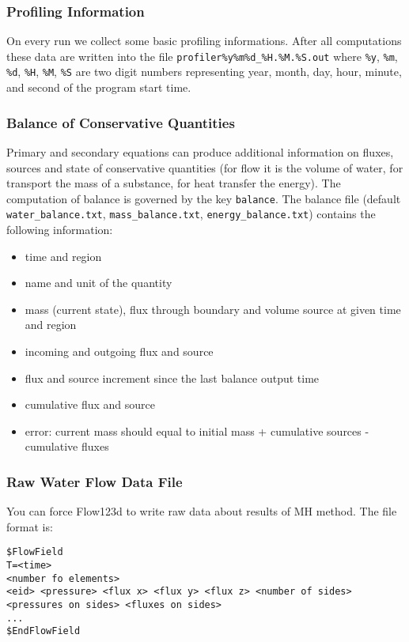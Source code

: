\subsubsection{Profiling Information}
On every run we collect some basic profiling informations. After all computations these data are written into the file
\verb'profiler%y%m%d_%H.%M.%S.out' where \verb'%y', \verb'%m', \verb'%d', \verb'%H', \verb'%M', \verb'%S' are 
two digit numbers representing year, month, day, hour, minute, and second of the program start time.

\subsubsection{Balance of Conservative Quantities}
Primary and secondary equations can produce additional information on fluxes, sources and state of conservative quantities (for flow it is the volume of water, for transport the mass of a substance, for heat transfer the energy).
The computation of balance is governed by the key \verb'balance'.
The balance file (default \verb'water_balance.txt', \verb'mass_balance.txt', \verb'energy_balance.txt') contains the following information:
\begin{itemize}
\item time and region
\item name and unit of the quantity
\item mass (current state), flux through boundary and volume source at given time and region
\item incoming and outgoing flux and source
\item flux and source increment since the last balance output time
\item cumulative flux and source
\item error: current mass should equal to initial mass + cumulative sources - cumulative fluxes
\end{itemize}


\subsubsection{Raw Water Flow Data File}
You can force Flow123d to write raw data about results of MH method. The file format is:
\begin{verbatim}
$FlowField
T=<time>
<number fo elements>
<eid> <pressure> <flux x> <flux y> <flux z> <number of sides> <pressures on sides> <fluxes on sides> 
...
$EndFlowField
\end{verbatim}

